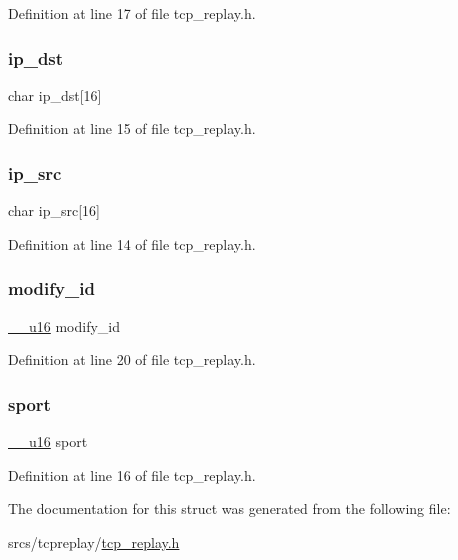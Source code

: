 Definition at line 17 of file tcp\+\_\+replay.\+h.

\mbox{\label{structsession_a26569f16f1e89a255280f1547a056ee1}} 
\subsubsection{\texorpdfstring{ip\+\_\+dst}{ip\_dst}}
{\footnotesize\ttfamily char ip\+\_\+dst\mbox{[}16\mbox{]}}



Definition at line 15 of file tcp\+\_\+replay.\+h.

\mbox{\label{structsession_afd2c9d1acf6d5aeebaf414b8d0c781dc}} 
\subsubsection{\texorpdfstring{ip\+\_\+src}{ip\_src}}
{\footnotesize\ttfamily char ip\+\_\+src\mbox{[}16\mbox{]}}



Definition at line 14 of file tcp\+\_\+replay.\+h.

\mbox{\label{structsession_abd86bc9fbe91c70dbf358b176f8791aa}} 
\subsubsection{\texorpdfstring{modify\+\_\+id}{modify\_id}}
{\footnotesize\ttfamily \hyperlink{asm__types_8h_abc70358187152575fd05fbf6d253151f}{\+\_\+\+\_\+u16} modify\+\_\+id}



Definition at line 20 of file tcp\+\_\+replay.\+h.

\mbox{\label{structsession_a5932845efeeab2e1c9720ebebe6bb87c}} 
\subsubsection{\texorpdfstring{sport}{sport}}
{\footnotesize\ttfamily \hyperlink{asm__types_8h_abc70358187152575fd05fbf6d253151f}{\+\_\+\+\_\+u16} sport}



Definition at line 16 of file tcp\+\_\+replay.\+h.



The documentation for this struct was generated from the following file\+:\begin{DoxyCompactItemize}
\item 
srcs/tcpreplay/\hyperlink{tcp__replay_8h}{tcp\+\_\+replay.\+h}\end{DoxyCompactItemize}
